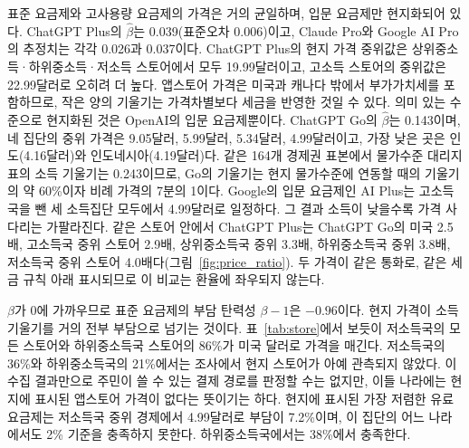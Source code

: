 \documentclass[11pt]{article}
\theoremstyle{definition}
\theoremstyle{remark}
\begin{document}
표준 요금제와 고사용량 요금제의 가격은 거의 균일하며, 입문 요금제만 현지화되어 있다. ChatGPT Plus의 $\hat\beta$는 0.039(표준오차 0.006)이고, Claude Pro와 Google AI Pro의 추정치는 각각 0.026과 0.037이다. ChatGPT Plus의 현지 가격 중위값은 상위중소득·하위중소득·저소득 스토어에서 모두 19.99달러이고, 고소득 스토어의 중위값은 22.99달러로 오히려 더 높다. 앱스토어 가격은 미국과 캐나다 밖에서 부가가치세를 포함하므로, 작은 양의 기울기는 가격차별보다 세금을 반영한 것일 수 있다. 의미 있는 수준으로 현지화된 것은 OpenAI의 입문 요금제뿐이다. ChatGPT Go의 $\hat\beta$는 0.143이며, 네 집단의 중위 가격은 9.05달러, 5.99달러, 5.34달러, 4.99달러이고, 가장 낮은 곳은 인도(4.16달러)와 인도네시아(4.19달러)다. 같은 164개 경제권 표본에서 물가수준 대리지표의 소득 기울기는 0.243이므로, Go의 기울기는 현지 물가수준에 연동할 때의 기울기의 약 60\%이자 비례 가격의 7분의 1이다. Google의 입문 요금제인 AI Plus는 고소득국을 뺀 세 소득집단 모두에서 4.99달러로 일정하다. 그 결과 소득이 낮을수록 가격 사다리는 가팔라진다. 같은 스토어 안에서 ChatGPT Plus는 ChatGPT Go의 미국 2.5배, 고소득국 중위 스토어 2.9배, 상위중소득국 중위 3.3배, 하위중소득국 중위 3.8배, 저소득국 중위 스토어 4.0배다(그림~\ref{fig:price_ratio}). 두 가격이 같은 통화로, 같은 세금 규칙 아래 표시되므로 이 비교는 환율에 좌우되지 않는다.

$\beta$가 0에 가까우므로 표준 요금제의 부담 탄력성 $\beta-1$은 $-0.96$이다. 현지 가격이 소득 기울기를 거의 전부 부담으로 넘기는 것이다. 표~\ref{tab:store}에서 보듯이 저소득국의 모든 스토어와 하위중소득국 스토어의 86\%가 미국 달러로 가격을 매긴다. 저소득국의 36\%와 하위중소득국의 21\%에서는 조사에서 현지 스토어가 아예 관측되지 않았다. 이 수집 결과만으로 주민이 쓸 수 있는 결제 경로를 판정할 수는 없지만, 이들 나라에는 현지에 표시된 앱스토어 가격이 없다는 뜻이기는 하다. 현지에 표시된 가장 저렴한 유료 요금제는 저소득국 중위 경제에서 4.99달러로 부담이 7.2\%이며, 이 집단의 어느 나라에서도 2\% 기준을 충족하지 못한다. 하위중소득국에서는 38\%에서 충족한다.
\end{document}
